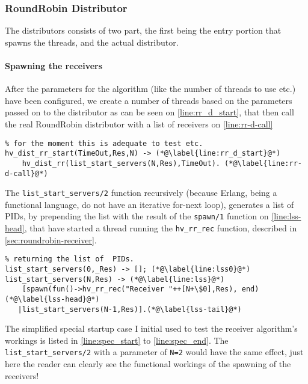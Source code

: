 \subsubsection{RoundRobin Distributor}
\label{sec:roundr-distr}

The distributors consists of two part, the first being the entry
portion that spawns the threads,
and the actual distributor. 

\paragraph{Spawning the receivers}
\label{sec:spawning-receivers}

After the parameters for the algorithm (like the number of threads to
use etc.) have been configured, we create a number of threads based on
the parameters passed on to the distributor as can be seen on
\autoref{line:rr_d_start}, that then call the real RoundRobin
distributor with a list of receivers on \autoref{line:rr-d-call}

\begin{lstlisting}[name=hvp2]
%Number of servers variable, should make that a number to pass too, but 
% for the moment this is adequate to test etc.
hv_dist_rr_start(TimeOut,Res,N) -> (*@\label{line:rr_d_start}@*)
	hv_dist_rr(list_start_servers(N,Res),TimeOut). (*@\label{line:rr-d-call}@*)
\end{lstlisting}

The \texttt{list\_start\_servers/2} function recursively (because
Erlang, being a functional language, do not have an iterative for-next
loop), generates a list of PIDs, by prepending the list with the
result of the \texttt{spawn/1} function on \autoref{line:lss-head},
that have started a thread running the \texttt{hv\_rr\_rec} function,
described in \autoref{sec:roundrobin-receiver}.

\begin{lstlisting}[name=hvp2]
%Start N round-robin receivers that will send their results to Res
% returning the list of	 PIDs.
list_start_servers(0,_Res) -> []; (*@\label{line:lss0}@*)
list_start_servers(N,Res) -> (*@\label{line:lss}@*)
	[spawn(fun()->hv_rr_rec("Receiver "++[N+\$0],Res), end) (*@\label{lss-head}@*)
   |list_start_servers(N-1,Res)].(*@\label{lss-tail}@*)
\end{lstlisting}

The simplified special startup case I initial used to test the
receiver algorithm's workings is listed in \autoref{line:spec_start}
to \autoref{line:spec_end}. The \texttt{list\_start\_servers/2} with a
parameter of \texttt{N=2} would have the same effect, just here the
reader can clearly see the functional workings of the spawning of the
receivers!


